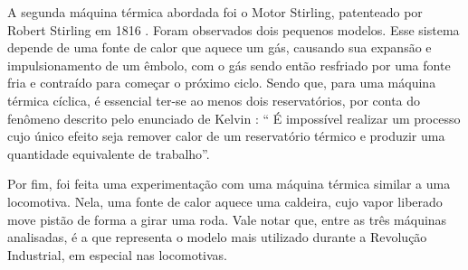 A segunda máquina térmica abordada foi o Motor Stirling, patenteado por Robert Stirling em 1816 \cite{lopes2022motor}. Foram observados dois pequenos modelos. Esse sistema depende de uma fonte de calor que aquece um gás, causando sua expansão e impulsionamento de um êmbolo, com o gás sendo então resfriado por uma fonte fria e contraído para começar o próximo ciclo. Sendo que, para uma máquina térmica cíclica, é essencial ter-se ao menos dois reservatórios, por conta do fenômeno descrito pelo enunciado de Kelvin \cite{Nussenzveig_2014}: “ É impossível realizar um processo cujo único efeito seja remover calor de um reservatório térmico e produzir uma quantidade equivalente de trabalho”. 

Por fim, foi feita uma experimentação com uma máquina térmica similar a uma locomotiva. Nela, uma fonte de calor aquece uma caldeira, cujo vapor liberado move pistão de forma a girar uma roda. Vale notar que, entre as três máquinas analisadas, é a que representa o modelo mais utilizado durante a Revolução Industrial, em especial nas locomotivas.



